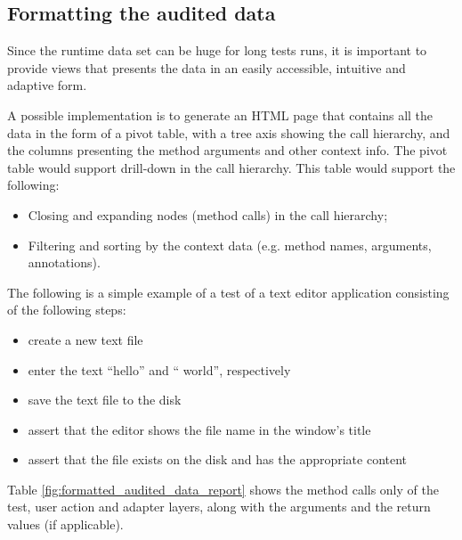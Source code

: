 \subsection {Formatting the audited data}

Since the runtime data set can be huge for long tests runs, it is important to provide views that presents the data in an easily accessible, intuitive and adaptive form. 

A possible implementation is to generate an HTML page that contains all the data in the form of a pivot table, with a tree axis showing the call hierarchy, and the columns presenting the method arguments and other context info. The pivot table would support drill-down in the call hierarchy. This table would support the following:
\begin{itemize}
\item Closing and expanding nodes (method calls) in the call hierarchy;
\item Filtering and sorting by the context data (e.g. method names, arguments, annotations).
\end{itemize}

The following is a simple example of a test of a text editor application consisting of the following steps:
\begin{itemize}
\item create a new text file
\item enter the text ``hello'' and `` world'', respectively
\item save the text file to the disk
\item assert that the editor shows the file name in the window's title
\item assert that the file exists on the disk and has the appropriate content
\end{itemize}

Table \ref{fig:formatted_audited_data_report} shows the method calls only of the test, user action and adapter layers, along with the arguments and the return values (if applicable).


